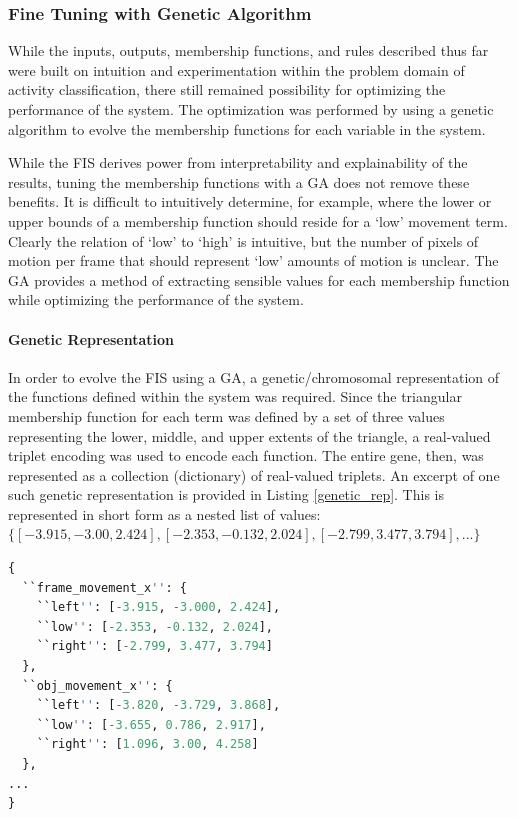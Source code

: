 \documentclass[12pt]{report}
\begin{document}
\subsubsection{Fine Tuning with Genetic Algorithm}
While the inputs, outputs, membership functions, and rules described thus far were built on intuition and experimentation within the problem domain of activity classification, there still remained possibility for optimizing the performance of the system. The optimization was performed by using a genetic algorithm to evolve the membership functions for each variable in the system. 

While the FIS derives power from interpretability and explainability of the results, tuning the membership functions with a GA does not remove these benefits. It is difficult to intuitively determine, for example, where the lower or upper bounds of a membership function should reside for a `low' movement term. Clearly the relation of `low' to `high' is intuitive, but the number of pixels of motion per frame that should represent `low' amounts of motion is unclear. The GA provides a method of extracting sensible values for each membership function while optimizing the performance of the system.

\paragraph{Genetic Representation}
In order to evolve the FIS using a GA, a genetic/chromosomal representation of the functions defined within the system was required. Since the triangular membership function for each term was defined by a set of three values representing the lower, middle, and upper extents of the triangle, a real-valued triplet encoding was used to encode each function. The entire gene, then, was represented as a collection (dictionary) of real-valued triplets. An excerpt of one such genetic representation is provided in Listing \ref{genetic_rep}. This is represented in short form as a nested list of values: $\{[-3.915, -3.00, 2.424], [-2.353, -0.132, 2.024], [-2.799, 3.477, 3.794], ...\}$

\begin{lstlisting}[language=Python, basicstyle=\small, columns=flexible, frame=single, label=genetic_rep, caption=Example JSON for Genetic Representation]
{
  ``frame_movement_x'': {
    ``left'': [-3.915, -3.000, 2.424], 
    ``low'': [-2.353, -0.132, 2.024], 
    ``right'': [-2.799, 3.477, 3.794]
  }, 
  ``obj_movement_x'': {
    ``left'': [-3.820, -3.729, 3.868], 
    ``low'': [-3.655, 0.786, 2.917], 
    ``right'': [1.096, 3.00, 4.258]
  },
...
}
\end{lstlisting}
\end{document}
